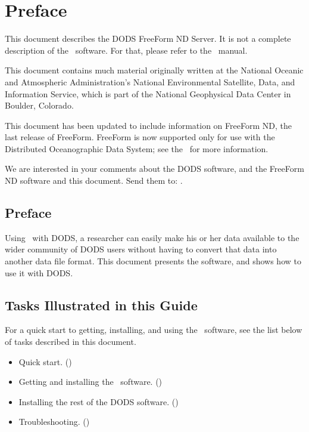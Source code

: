 %
%

\T\chapter*{Preface}
\T{}

This document describes the DODS FreeForm ND Server.  It is not a
complete description of the \ffnd\ software.  For that, please refer
to the \ffnd\ manual.

This document contains much material originally written at the
National Oceanic and Atmospheric Administration's National
Environmental Satellite, Data, and Information Service, which is part
of the National Geophysical Data Center in Boulder, Colorado.

This document has been updated to include information on FreeForm ND,
the last release of FreeForm. FreeForm is now supported only for use
with the Distributed Oceanographic Data System; see the 
\DODShome\ for more information.

We are interested in your comments about the DODS software, and the
FreeForm ND software and this document.  Send them to:
.

\begin{ifhtml}
  \chapter*{Preface}
\end{ifhtml}

Using \ffnd\ with DODS, a researcher can easily make his or her data
available to the wider community of DODS users without having to
convert that data into another data file format.  This document
presents the \ffnd software, and shows how to use it with DODS.

\section{Tasks Illustrated in this Guide}
\label{pref,tasks}

For a quick start to getting, installing, and using the \ffnd\
software, see the list below of tasks described in this document.

\begin{itemize}

\item Quick start. ()

\item Getting and installing the \ffnd\ software. 
()

\item Installing the rest of the DODS software. 
()

\item Troubleshooting. (\pagexref{a})

\end{itemize}



